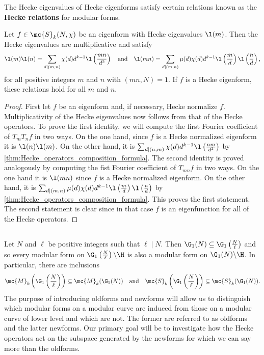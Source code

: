 \documentclass[12pt]{article}
\begin{document}
      The Hecke eigenvalues of Hecke eigenforms satisfy certain relations known as the \textbf{Hecke relations} for modular forms.

      \begin{proposition*}
        Let \(f \in \mc{S}_{k}(N,\chi)\) be an eigenform with Hecke eigenvalues \(\l(m)\). Then the Hecke eigenvalues are multiplicative and satisfy
        \[
          \l(m)\l(n) = \sum_{d \mid (m,n)}\chi(d)d^{k-1}\l\left(\frac{mn}{d^{2}}\right) \quad \text{and} \quad \l(mn) = \sum_{d \mid (m,n)}\mu(d)\chi(d)d^{k-1}\l\left(\frac{m}{d}\right)\l\left(\frac{n}{d}\right),
        \]
        for all positive integers \(m\) and \(n\) with \((mn,N) = 1\). If \(f\) is a Hecke eigenform, these relations hold for all \(m\) and \(n\).
      \end{proposition*}
      \begin{proof}
        First let \(f\) be an eigenform and, if necessary, Hecke normalize \(f\). Multiplicativity of the Hecke eigenvalues now follows from that of the Hecke operators. To prove the first identity, we will compute the first Fourier coefficient of \(T_{m}T_{n}f\) in two ways. On the one hand, since \(f\) is a Hecke normalized eigenform it is \(\l(n)\l(m)\). On the other hand, it is \(\sum_{d \mid (n,m)}\chi(d)d^{k-1}\l\left(\frac{nm}{d^{2}}\right)\) by \cref{thm:Hecke_operators_composition_formula}. The second identity is proved analogously by computing the fist Fourier coefficient of \(T_{mn}f\) in two ways. On the one hand it is \(\l(mn)\) since \(f\) is a Hecke normalized eigenform. On the other hand, it is \(\sum_{d \mid (m,n)}\mu(d)\chi(d)d^{k-1}\l\left(\frac{m}{d}\right)\l\left(\frac{n}{d}\right)\) by \cref{thm:Hecke_operators_composition_formula}. This proves the first statement. The second statement is clear since in that case \(f\) is an eigenfunction for all of the Hecke operators.
      \end{proof}
    \subsection{}
      Let \(N\) and \(\ell\) be positive integers such that \(\ell \mid N\). Then \(\G_{1}(N) \subseteq \G_{1}\left(\frac{N}{\ell}\right)\) and so every modular form on \(\G_{1}\left(\frac{N}{\ell}\right)\backslash\H\) is also a modular form on \(\G_{1}(N)\backslash\H\). In particular, there are inclusions
      \[
        \mc{M}_{k}\left(\G_{1}\left(\frac{N}{\ell}\right)\right) \subseteq \mc{M}_{k}(\G_{1}(N)) \quad \text{and} \quad \mc{S}_{k}\left(\G_{1}\left(\frac{N}{\ell}\right)\right) \subseteq \mc{S}_{k}(\G_{1}(N)).
      \]
      The purpose of introducing oldforms and newforms will allow us to distinguish which modular forms on a modular curve are induced from those on a modular curve of lower level and which are not. The former are referred to as oldforms and the latter newforms. Our primary goal will be to investigate how the Hecke operators act on the subspace generated by the newforms for which we can say more than the oldforms.
\end{document}
